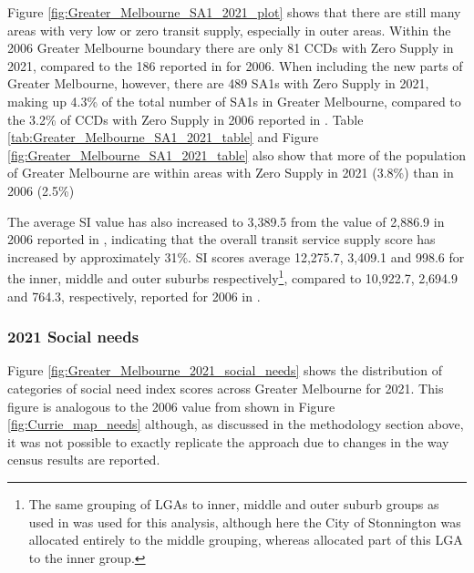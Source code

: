 \documentclass[preprint, 3p,
authoryear]{elsarticle} %
\begin{document}
Figure \ref{fig:Greater_Melbourne_SA1_2021_plot} shows that there are
still many areas with very low or zero transit supply, especially in
outer areas. Within the 2006 Greater Melbourne boundary there are only
81 CCDs with Zero Supply in 2021, compared to the 186 reported in
\citet{currie2010identifying} for 2006. When including the new parts of
Greater Melbourne, however, there are 489 SA1s with Zero Supply in 2021,
making up 4.3\% of the total number of SA1s in Greater Melbourne,
compared to the 3.2\% of CCDs with Zero Supply in 2006 reported in
\citet{currie2010identifying}. Table
\ref{tab:Greater_Melbourne_SA1_2021_table} and Figure
\ref{fig:Greater_Melbourne_SA1_2021_table} also show that more of the
population of Greater Melbourne are within areas with Zero Supply in
2021 (3.8\%) than in 2006 (2.5\%)

The average SI value has also increased to 3,389.5 from the value of
2,886.9 in 2006 reported in \citet{currie2010identifying}, indicating
that the overall transit service supply score has increased by
approximately 31\%. SI scores average 12,275.7, 3,409.1 and 998.6 for
the inner, middle and outer suburbs respectively\footnote{The same
  grouping of LGAs to inner, middle and outer suburb groups as used in
  \citet{currie2010identifying} was used for this analysis, although
  here the City of Stonnington was allocated entirely to the middle
  grouping, whereas \citet{currie2010identifying} allocated part of this
  LGA to the inner group.}, compared to 10,922.7, 2,694.9 and 764.3,
respectively, reported for 2006 in \citet{currie2010identifying}.

\hypertarget{social-needs}{%
\subsubsection{2021 Social needs}\label{social-needs}}

Figure \ref{fig:Greater_Melbourne_2021_social_needs} shows the
distribution of categories of social need index scores across Greater
Melbourne for 2021. This figure is analogous to the 2006 value from
\citet{currie2010identifying} shown in Figure \ref{fig:Currie_map_needs}
although, as discussed in the methodology section above, it was not
possible to exactly replicate the \citet{currie2010identifying} approach
due to changes in the way census results are reported.
\end{document}
